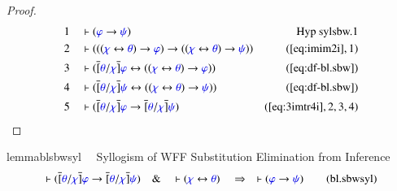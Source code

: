 \begin{proof}
\begin{align}
  1 &&  & \vdash ( \mw{\varphi} \rightarrow \mw{\psi}
      )&\text{Hyp~sylsbw.1}\notag%
  \\ 2 &&  & \vdash ( ( ( \mw{\chi} \leftrightarrow \mw{\theta} ) \rightarrow
      \mw{\varphi} ) \rightarrow ( ( \mw{\chi}
      \leftrightarrow \mw{\theta} ) \rightarrow \mw{\psi} )
      )&(\mbox{\ref{eq:imim2i}},1)\notag
  \\ 3 &&  & \vdash ( \overline{[} \mw{\theta} / \mw{\chi} \overline{]}
      \mw{\varphi} \leftrightarrow ( ( \mw{\chi}
      \leftrightarrow \mw{\theta} ) \rightarrow
      \mw{\varphi} ) )&(\mbox{\ref{eq:df-bl.sbw}})\notag
  \\ 4 &&  & \vdash ( \overline{[} \mw{\theta} / \mw{\chi} \overline{]}
      \mw{\psi} \leftrightarrow ( ( \mw{\chi}
      \leftrightarrow \mw{\theta} ) \rightarrow \mw{\psi} )
      )&(\mbox{\ref{eq:df-bl.sbw}})\notag
  \\ 5 &&  & \vdash ( \overline{[} \mw{\theta} / \mw{\chi} \overline{]}
      \mw{\varphi} \rightarrow \overline{[} \mw{\theta} /
      \mw{\chi} \overline{]} \mw{\psi}
      )&(\mbox{\ref{eq:3imtr4i}},2,3,4)\notag
\end{align}
\end{proof}

\begin{restatable}{lemma}{blsbwsyl}~~ Syllogism of WFF Substitution Elimination
from Inference
\begin{align}
\vdash ( \overline{[} \mw{\theta} / \mw{\chi} \overline{]} \mw{\varphi}
    \rightarrow \overline{[} \mw{\theta} / \mw{\chi} \overline{]} \mw{\psi}
    )\quad\&\quad \vdash ( \mw{\chi} \leftrightarrow \mw{\theta}
    )\quad\Rightarrow\quad \vdash ( \mw{\varphi} \rightarrow \mw{\psi}
    )\label{eq:bl.sbwsyl}\tag{bl.sbwsyl}
\end{align}
\end{restatable}

